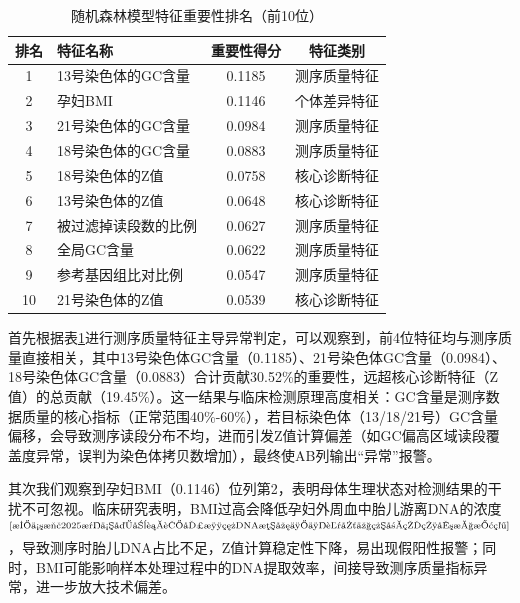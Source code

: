 \documentclass[withoutpreface,bwprint]{cumcmthesis} %
\begin{document}
\begin{table}[H]
    \centering  %
    \caption{随机森林模型特征重要性排名（前10位）}  %
    \label{tab:随机森林模型特征排名}  %
    \begin{threeparttable}
        \begin{tabularx}{0.75\textwidth}{c l c c}
            \toprule[1.5pt]
            \textbf{排名} & \textbf{特征名称} & \textbf{重要性得分} & \textbf{特征类别} \\ 
            \midrule[1pt]
            1    & 13号染色体的GC含量      & 0.1185     & 测序质量特征     \\
            2    & 孕妇BMI                 & 0.1146     & 个体差异特征     \\
            3    & 21号染色体的GC含量      & 0.0984     & 测序质量特征     \\
            4    & 18号染色体的GC含量      & 0.0883     & 测序质量特征     \\
            5    & 18号染色体的Z值         & 0.0758     & 核心诊断特征     \\
            6    & 13号染色体的Z值         & 0.0648     & 核心诊断特征     \\
            7    & 被过滤掉读段数的比例    & 0.0627     & 测序质量特征     \\
            8    & 全局GC含量              & 0.0622     & 测序质量特征     \\
            9    & 参考基因组比对比例      & 0.0547     & 测序质量特征     \\
            10   & 21号染色体的Z值         & 0.0539     & 核心诊断特征     \\

            \bottomrule[1.5pt]
        \end{tabularx}
    \end{threeparttable}
\end{table}


首先根据表\ref{tab:随机森林模型特征排名}进行测序质量特征主导异常判定，可以观察到，前4位特征均与测序质量直接相关，其中13号染色体GC含量（0.1185）、21号染色体GC含量（0.0984）、18号染色体GC含量（0.0883）合计贡献30.52\%的重要性，远超核心诊断特征（Z值）的总贡献（19.45\%）。这一结果与临床检测原理高度相关：GC含量是测序数据质量的核心指标（正常范围40\%-60\%），若目标染色体（13/18/21号）GC含量偏移，会导致测序读段分布不均，进而引发Z值计算偏差（如GC偏高区域读段覆盖度异常，误判为染色体拷贝数增加），最终使AB列输出“异常”报警。

其次我们观察到孕妇BMI（0.1146）位列第2，表明母体生理状态对检测结果的干扰不可忽视。临床研究表明，BMI过高会降低孕妇外周血中胎儿游离DNA的浓度$^\text{\cite{李佳欣2025母体外周血胎儿游离DNA浓度与不良围产结局的相关性探究}}$，导致测序时胎儿DNA占比不足，Z值计算稳定性下降，易出现假阳性报警；同时，BMI可能影响样本处理过程中的DNA提取效率，间接导致测序质量指标异常，进一步放大技术偏差。
\end{document}
